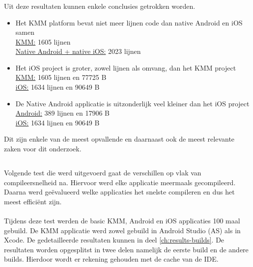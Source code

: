 \subsubsection{}
\label{sec:M-test-lijnen-code-conclusion}
Uit deze resultaten kunnen enkele conclusies getrokken worden.
\begin{itemize}
    \item Het KMM platform bevat niet meer lijnen code dan native Android en iOS samen\\
    \underline{KMM:} 1605 lijnen\\
    \underline{Native Android + native iOS:} 2023 lijnen\\
    \item Het iOS project is groter, zowel lijnen als omvang, dan het KMM project\\
    \underline{KMM:} 1605 lijnen en 77725 B\\
    \underline{iOS:} 1634 lijnen en 90649 B\\
    \item De Native Android applicatie is uitzonderlijk veel kleiner dan het iOS project\\
    \underline{Android:} 389 lijnen en 17906 B\\
    \underline{iOS:} 1634 lijnen en 90649 B
\end{itemize}

Dit zijn enkele van de meest opvallende en daarnaast ook de meest relevante zaken voor dit onderzoek.

\subsection{}
\label{sec:M-test-compileersnelheid}
Volgende test die werd uitgevoerd gaat de verschillen op vlak van compileersnelheid na. Hiervoor werd elke applicatie meermaals gecompileerd. Daarna werd geëvalueerd welke applicaties het snelste compileren en dus het meest efficiënt zijn.
\\ \\
Tijdens deze test werden de basic KMM, Android en iOS applicaties 100 maal gebuild. De KMM applicatie werd zowel gebuild in Android Studio (AS) als in Xcode. De gedetailleerde resultaten kunnen in deel \ref{ch:results-builds}. De resultaten worden opgesplitst in twee delen namelijk de eerste build en de andere builds. Hierdoor wordt er rekening gehouden met de cache van de IDE.

